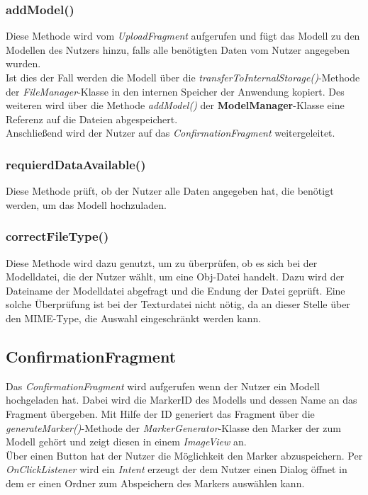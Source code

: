 \subsubsection{addModel()}
Diese Methode wird vom \textit{UploadFragment} aufgerufen und fügt das Modell zu den Modellen des Nutzers hinzu, falls alle benötigten Daten vom Nutzer angegeben wurden.\\
Ist dies der Fall werden die Modell über die \textit{transferToInternalStorage()}-Methode der \textit{FileManager}-Klasse in den internen Speicher der Anwendung kopiert. Des weiteren wird über die Methode \textit{addModel()} der \textbf{ModelManager}-Klasse eine Referenz auf die Dateien abgespeichert. \\
Anschließend wird der Nutzer auf das \textit{ConfirmationFragment} weitergeleitet.

\subsubsection{requierdDataAvailable()}
Diese Methode prüft, ob der Nutzer alle Daten angegeben hat, die benötigt werden, um das Modell hochzuladen.

\subsubsection{correctFileType()}
Diese Methode wird dazu genutzt, um zu überprüfen, ob es sich bei der Modelldatei, die der Nutzer wählt, um eine Obj-Datei handelt. Dazu wird der Dateiname der Modelldatei abgefragt und die Endung der Datei geprüft. Eine solche Überprüfung ist bei der Texturdatei nicht nötig, da an dieser Stelle über den MIME-Type, die Auswahl eingeschränkt werden kann.

\subsection{ConfirmationFragment}
Das \textit{ConfirmationFragment} wird aufgerufen wenn der Nutzer ein Modell hochgeladen hat. Dabei wird die MarkerID des Modells und dessen Name an das Fragment übergeben. Mit Hilfe der ID generiert das Fragment über die \textit{generateMarker()}-Methode der \textit{MarkerGenerator}-Klasse den Marker der zum Modell gehört und zeigt diesen in einem \textit{ImageView} an.\\
Über einen Button hat der Nutzer die Möglichkeit den Marker abzuspeichern. Per \textit{OnClickListener} wird ein \textit{Intent} erzeugt der dem Nutzer einen Dialog öffnet in dem er einen Ordner zum Abspeichern des Markers auswählen kann. 

